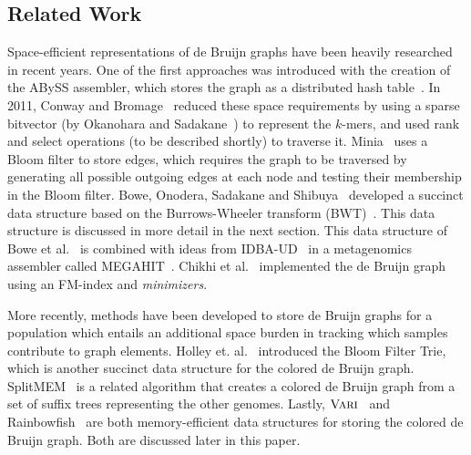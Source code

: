 \subsection{Related Work}


Space-efficient representations of de Bruijn graphs have been heavily researched in recent years. One of the first approaches was introduced with the creation of the ABySS assembler, which stores the graph as a distributed hash table~\cite{Simpson:2009}.  In 2011, Conway and Bromage~\cite{conway} reduced these space requirements  by using a sparse bitvector (by Okanohara and Sadakane~\cite{bitvector}) to represent the $k$-mers, and used rank and select operations (to be described shortly) to traverse it.  Minia~\cite{wabi} uses a Bloom filter to store edges, which requires the graph to be traversed by generating all possible outgoing edges at each node and testing their membership in the Bloom filter. Bowe, Onodera, Sadakane and Shibuya~\cite{BOSS12} developed a succinct data structure based on the Burrows-Wheeler transform  (BWT)~\cite{bw1994}.  This data structure is discussed in more detail in the next section.  This data structure of Bowe et al.~\cite{BOSS12} is combined with ideas from IDBA-UD~\cite{idbaud} in a metagenomics assembler called MEGAHIT~\cite{megahit}.   Chikhi {et al.}~\cite{paul} implemented the de Bruijn graph using an FM-index and {\em minimizers}.

More recently, methods have been developed to store de Bruijn graphs for a population which entails an additional space burden in tracking which samples contribute to graph elements. Holley et. al.~\cite{holley2015bloom} introduced the Bloom Filter Trie, which is another succinct data structure for the colored de Bruijn graph.  SplitMEM~\cite{splitmem} is a related algorithm that creates a colored de Bruijn graph from a set of suffix trees representing the other genomes.  Lastly, $\mbox{\rm {\sc Vari}}$~\cite{vari} and Rainbowfish~\cite{rainbowfish} are both memory-efficient data structures for storing the colored de Bruijn graph.  Both are discussed later in this paper.

